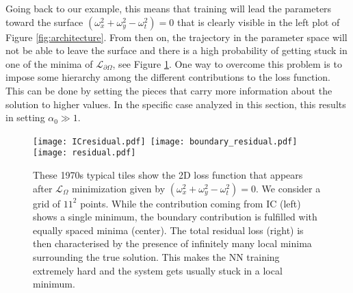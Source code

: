 \documentclass{article}
\newcommand{\mc}{\mathcal}
\begin{document}
Going back to our example, this means that training will lead the parameters toward the surface $(\omega_x^2+\omega_y^2-\omega_t^2)=0$ that is clearly visible in the left plot of Figure \ref{fig:architecture}. From then on, the trajectory in the parameter space will not be able to leave the surface and there is a high probability of getting stuck in one of the minima of $\mc{L}_{\partial\Omega}$, see Figure \ref{fig:minima}. One way to overcome this problem is to impose some hierarchy among the different contributions to the loss function. This can be done by setting the pieces that carry more information about the solution to higher values. In the specific case analyzed in this section, this results in setting $\alpha_0\gg 1$.

\begin{figure}[t!]
\begin{center}
  \texttt{[image: ICresidual.pdf]}\, \texttt{[image: boundary\_residual.pdf]}\, \texttt{[image: residual.pdf]}
  \caption{These 1970s typical tiles show the 2D loss function that appears after $\mc{L}_\Omega$ minimization given by $(\omega_x^2+\omega_y^2-\omega_t^2)=0$. We consider a grid of $11^2$ points. While the contribution coming from IC (left) shows a single minimum, the boundary contribution is fulfilled with equally spaced minima (center).  The total residual loss (right) is then characterised by the presence of infinitely many local minima surrounding the true solution. This makes the NN training extremely hard and the system gets usually stuck in a local minimum.  }
\label{fig:minima}
  \end{center}
\end{figure}
\end{document}
